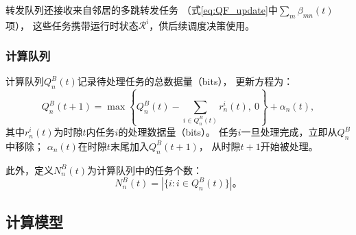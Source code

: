 \documentclass[a4paper,11pt]{article}
\begin{document}
转发队列还接收来自邻居的多跳转发任务
（式\eqref{eq:QF_update}中$\sum_{m}\beta_{mn}(t)$项），
这些任务携带运行时状态$\mathcal{R}^i$，供后续调度决策使用。

\subsubsection{计算队列}

计算队列$Q^B_n(t)$记录待处理任务的总数据量（bits），
更新方程为\cite{zhang2024mhspo}：
\begin{equation}
    Q^B_n(t\!+\!1) = \max\!\left\{Q^B_n(t)
    - \sum_{i \in Q^B_n(t)} r^i_n(t),~0\right\}
    + \alpha_n(t),
    \label{eq:QB_update}
\end{equation}
其中$r^i_n(t)$为时隙$t$内任务$i$的处理数据量（bits）。
任务$i$一旦处理完成，立即从$Q^B_n$中移除；
$\alpha_n(t)$在时隙$t$末尾加入$Q^B_n(t+1)$，
从时隙$t+1$开始被处理。

此外，定义$N^B_n(t)$为计算队列中的任务个数：
\begin{equation}
    N^B_n(t) = |\{i : i \in Q^B_n(t)\}|。
\end{equation}

\subsection{计算模型}
\end{document}
